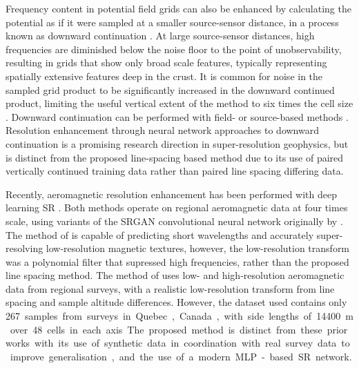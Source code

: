 \documentclass[manuscript.tex]{subfiles}
\begin{document}
Frequency content in potential field grids can also be enhanced by calculating the potential as if it were sampled at a smaller source-sensor distance, in a process known as downward continuation \parencite{bullardDeterminationMassesNecessary1948}.
At large source-sensor distances, high frequencies are diminished below the noise floor to the point of unobservability, resulting in grids that show only broad scale features, typically representing spatially extensive features deep in the crust.
It is common for noise in the sampled grid product to be significantly increased in the downward continued product, limiting the useful vertical extent of the method to six times the cell size \parencite{dampneyEquivalentSourceTechnique1969,zuoDownwardContinuationTransformation2020}.
Downward continuation can be performed with field- or source-based methods \parencite{pilkingtonPotentialFieldContinuation2017}.
Resolution enhancement through neural network approaches to downward continuation \parencite{liStableDownwardContinuation2023,yeHighprecisionDownwardContinuation2022} is a promising research direction in super-resolution geophysics, but is distinct from the proposed line-spacing based method due to its use of paired vertically continued training data rather than paired line spacing differing data.

Recently, aeromagnetic resolution enhancement has been performed with deep learning SR \parencite{bavandsavadkoohiHighresolutionAeromagneticMap2023,smithMagneticGridResolution2022}.
Both methods operate on regional aeromagnetic data at four times scale, using variants of the SRGAN convolutional neural network originally by \textcite{ledigPhotorealisticSingleImage2017}.
The method of \textcite{smithMagneticGridResolution2022} is capable of predicting short wavelengths and accurately super-resolving low-resolution magnetic textures, however, the low-resolution transform was a polynomial filter that supressed high frequencies, rather than the proposed line spacing method.
The method of \textcite{bavandsavadkoohiHighresolutionAeromagneticMap2023} uses low- and high-resolution aeromagnetic data from regional surveys, with a realistic low-resolution transform from line spacing and sample altitude differences.
However, the dataset used contains only \qty{267} samples from surveys in Quebec, Canada, with side lengths of \qty{14400}{\m} over \qty{48} cells in each axis.
The proposed method is distinct from these prior works with its use of synthetic data in coordination with real survey data to improve generalisation, and the use of a modern MLP-based SR network.
\end{document}
